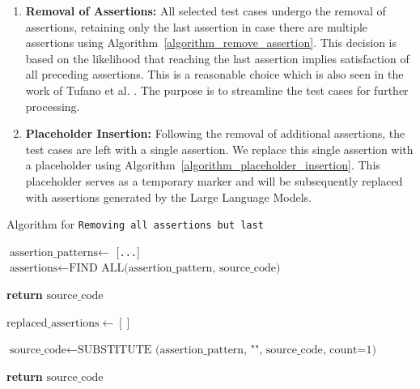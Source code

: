    \begin{enumerate}
        \item \textbf{Removal of Assertions:} All selected test cases undergo the removal of assertions, retaining only the last assertion in case there are multiple assertions using Algorithm~\ref{algorithm_remove_assertion}. This decision is based on the likelihood that reaching the last assertion implies satisfaction of all preceding assertions. This is a reasonable choice which is also seen in the work of Tufano et al. \cite{tufano_generating_2022}. The purpose is to streamline the test cases for further processing.

        \item \textbf{Placeholder Insertion:} Following the removal of additional assertions, the test cases are left with a single assertion. We replace this single assertion with a placeholder using Algorithm~\ref{algorithm_placeholder_insertion}. This placeholder serves as a temporary marker and will be subsequently replaced with assertions generated by the Large Language Models.
    \end{enumerate}

    \begin{algorithm}[H]
        \caption{Algorithm for \texttt{Removing all assertions but last}}
        \label{algorithm_remove_assertion}
        \begin{algorithmic}[1]
            \State $\text{assertion\_patterns} \gets$ [\texttt{...}] 
            \State $\text{assertions} \gets \text{FIND ALL(assertion\_pattern, source\_code)}$
        
                \State \textbf{return} $\text{source\_code}$
            \EndIf
        
            \State $\text{replaced\_assertions} \gets []$
        
                \State $\text{source\_code} \gets \text{SUBSTITUTE (assertion\_pattern, "", source\_code, count=1)}$
            \EndFor
        
            \State \textbf{return} $\text{source\_code}$
        \EndFunction
        \end{algorithmic}
        \end{algorithm}

